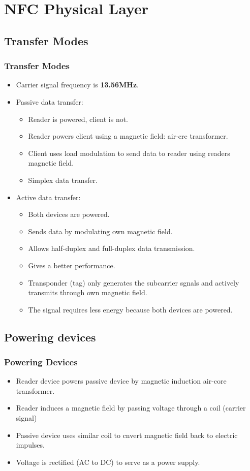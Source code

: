 \documentclass{beamer}
\begin{document}
\section{NFC Physical Layer}
\subsection{Transfer Modes}
\begin{frame}
\frametitle{Transfer Modes}
\begin{itemize}
\item Carrier signal frequency is \textbf{13.56MHz}.
\item Passive data transfer:
\begin{itemize}
\item Reader is powered, client is not.
\item Reader powers client using a magnetic field: {\color{red}air-cre transformer}.
\item Client uses load modulation to send data to reader using readers magnetic field.
\item {\color{green}Simplex data transfer}.
\end{itemize}
\item Active data transfer:
\begin{itemize}
\item Both devices are powered.
\item Sends data by modulating own magnetic field.
\item Allows half-duplex and full-duplex data transmission.
\item Gives a better performance.
\item Transponder (tag) only generates the subcarrier sgnals and actively transmits through own magnetic field.
\item The signal requires less energy because both devices are powered.
\end{itemize}
\end{itemize}
\end{frame}
\subsection{Powering devices}
\begin{frame}
\frametitle{Powering Devices}
\begin{itemize}
\item Reader device powers passive device by magnetic induction {\color{red}air-core transformer}.
\item Reader induces a magnetic field by passing voltage through a coil (carrier signal)
\item Passive device uses similar coil to cnvert magnetic field back to electric impulses.
\item Voltage is {\color{green}rectified (AC to DC)} to serve as a power supply.
\end{itemize}
\end{frame}
\end{document}
